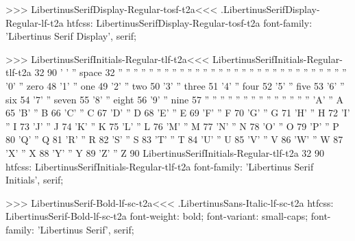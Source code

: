 {{{{>>>
\<LibertinusSerifDisplay-Regular-tosf-t2a\><<<
.LibertinusSerifDisplay-Regular-lf-t2a
htfcss:  LibertinusSerifDisplay-Regular-tosf-t2a  font-family: 'Libertinus Serif Display', serif;

>>>
\<LibertinusSerifInitials-Regular-tlf-t2a\><<<
LibertinusSerifInitials-Regular-tlf-t2a 32 90
' ' '' space 32  %
'' ''            %
'' ''            %
'' ''            %
'' ''            %
'' ''            %
'' ''            %
'' ''            %
'' ''            %
'' ''            %
'' ''            %
'' ''            %
'' ''            %
'' ''            %
'' ''            %
'' ''            %
'0' '' zero 48   %
'1' '' one 49    %
'2' '' two 50
'3' '' three 51
'4' '' four 52
'5' '' five 53
'6' '' six 54
'7' '' seven 55
'8' '' eight 56
'9' '' nine 57
'' ''  
'' ''  
'' ''  
'' ''  
'' ''  
'' ''  
'' ''  
'A' '' A 65
'B' '' B 66
'C' '' C 67
'D' '' D 68
'E' '' E 69
'F' '' F 70
'G' '' G 71
'H' '' H 72
'I' '' I 73
'J' '' J 74
'K' '' K 75
'L' '' L 76
'M' '' M 77
'N' '' N 78
'O' '' O 79
'P' '' P 80
'Q' '' Q 81
'R' '' R 82
'S' '' S 83
'T' '' T 84
'U' '' U 85
'V' '' V 86
'W' '' W 87
'X' '' X 88
'Y' '' Y 89
'Z' '' Z 90
LibertinusSerifInitials-Regular-tlf-t2a 32 90
htfcss:  LibertinusSerifInitials-Regular-tlf-t2a  font-family: 'Libertinus Serif Initials', serif;

>>>
\<LibertinusSerif-Bold-lf-sc-t2a\><<<
.LibertinusSans-Italic-lf-sc-t2a
htfcss:  LibertinusSerif-Bold-lf-sc-t2a  font-weight: bold; font-variant: small-caps; font-family: 'Libertinus Serif', serif;

}}}}
